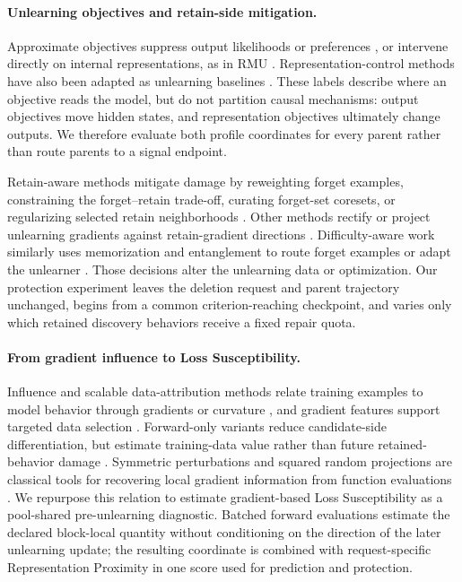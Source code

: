 \paragraph{Unlearning objectives and retain-side mitigation.}
Approximate objectives suppress output likelihoods or preferences
\cite{jang2023knowledge,yao2024large,zhang2024negative,fan2024simplicity}, or
intervene directly on internal representations, as in RMU
\cite{li2024wmdp}. Representation-control methods have also been adapted as
unlearning baselines \cite{rosati2024repnoise,zou2024circuit}. These labels
describe where an objective reads the model, but do not partition causal
mechanisms: output objectives move hidden states, and representation
objectives ultimately change outputs. We therefore evaluate both profile
coordinates for every parent rather than route parents to a signal endpoint.

Retain-aware methods mitigate damage by reweighting forget examples,
constraining the forget--retain trade-off, curating forget-set coresets, or
regularizing selected retain neighborhoods
\cite{niu2025guard,chen2026hamu,patil2025upcore,chang2025retain,
cheng2026entanglement}. Other methods rectify or project unlearning gradients
against retain-gradient directions
\cite{wang2025gru,huang2024unified,zhou2025implicit,zhou2025geometric}.
Difficulty-aware work similarly uses memorization and entanglement to route
forget examples or adapt the unlearner
\cite{zhao2024what,cheng2026cud,chen2026hamu}. Those decisions alter the
unlearning data or optimization. Our protection experiment leaves the
deletion request and parent trajectory unchanged, begins from a common
criterion-reaching checkpoint, and varies only which retained discovery
behaviors receive a fixed repair quota.

\paragraph{From gradient influence to Loss Susceptibility.}
Influence and scalable data-attribution methods relate training examples to
model behavior through gradients or curvature
\cite{koh2017influence,pruthi2020tracin,park2023trak,kwon2024datainf}, and
gradient features support targeted data selection \cite{xia2024less}.
Forward-only variants reduce candidate-side differentiation, but estimate
training-data value rather than future retained-behavior damage
\cite{ko2024mirrored,deng2026forvalue}. Symmetric perturbations and squared
random projections are classical tools for recovering local gradient
information from function evaluations
\cite{spall1992spsa,nesterov2017random,malladi2023mezo,
hutchinson1989stochastic}. We repurpose this relation to estimate gradient-based
Loss Susceptibility as a pool-shared pre-unlearning diagnostic. Batched forward
evaluations estimate the declared block-local quantity without conditioning on
the direction of the later unlearning update; the resulting coordinate is combined
with request-specific Representation Proximity in one score used for
prediction and protection.


